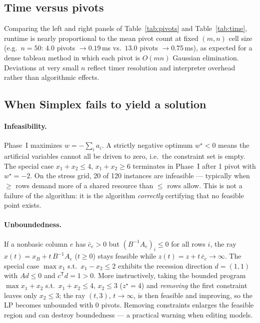 \documentclass[10pt]{article}
\begin{document}
\subsection{Time versus pivots}
Comparing the left and right panels of Table~\ref{tab:pivots} and
Table~\ref{tab:time}, runtime is nearly proportional to the mean pivot
count at fixed $(m,n)$ cell size
(e.g.\ $n=50$: $4.0$ pivots $\to 0.19$\,ms vs.\ $13.0$ pivots $\to
0.75$\,ms), as expected for a dense tableau method in which each pivot is
$O(mn)$ Gaussian elimination.  Deviations at very small $n$ reflect timer
resolution and interpreter overhead rather than algorithmic effects.

\subsection{When Simplex fails to yield a solution}
\paragraph{Infeasibility.} Phase~I maximizes $w=-\sum_i a_i$.  A strictly
negative optimum $w^\star<0$ means the artificial variables cannot all be
driven to zero, i.e.\ the constraint set is empty.  The special case
$x_1+x_2\le 4$, $x_1+x_2\ge 6$ terminates in Phase~I after 1 pivot with
$w^\star=-2$.  On the stress grid, 20 of 120 instances are infeasible ---
typically when $\ge$ rows demand more of a shared resource than $\le$ rows
allow.  This is not a failure of the algorithm: it is the algorithm
\emph{correctly} certifying that no feasible point exists.

\paragraph{Unboundedness.} If a nonbasic column $e$ has $\bar{c}_e>0$ but
$(B^{-1}A_e)_i \le 0$ for all rows $i$, the ray
$x(t) = x_B + t\, B^{-1}A_e$ ($t\ge 0$) stays feasible while
$z(t) = z + t\,\bar{c}_e \to \infty$.  The special case
$\max x_1$ s.t.\ $x_1-x_2\le 2$ exhibits the recession direction $d=(1,1)$
with $Ad\le 0$ and $c^{\mathsf T}d=1>0$.  More instructively, taking the
bounded program $\max x_1+x_2$ s.t.\ $x_1+x_2\le 4$, $x_2\le 3$ ($z^\star=4$)
and \emph{removing} the first constraint leaves only $x_2\le 3$; the ray
$(t,3)$, $t\to\infty$, is then feasible and improving, so the LP becomes
unbounded with 0 pivots.  Removing constraints enlarges the feasible region
and can destroy boundedness --- a practical warning when editing models.
\end{document}
